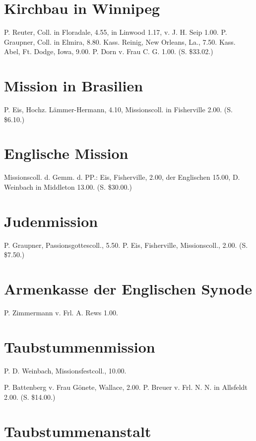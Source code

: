 \section{Kirchbau in Winnipeg}

P. Reuter, Coll. in Floradale, 4.55, in Linwood 1.17, v. J. H. Seip 1.00. P. Graupner, Coll. in Elmira, 8.80. Kass. Reinig, New Orleans, La., 7.50. Kass. Abel, Ft. Dodge, Iowa, 9.00. P. Dorn v. Frau C. G. 1.00. (S. \$33.02.)

\section{Mission in Brasilien}

P. Eis, Hochz. Lämmer-Hermann, 4.10, Missionscoll. in Fisherville 2.00. (S. \$6.10.)

\section{Englische Mission}

Missionscoll. d. Gemm. d. PP.: Eis, Fisherville, 2.00, der Englischen 15.00, D. Weinbach in Middleton 13.00. (S. \$30.00.)

\section{Judenmission}

P. Graupner, Passionsgottescoll., 5.50. P. Eis, Fisherville, Missionscoll., 2.00. (S. \$7.50.)

\section{Armenkasse der Englischen Synode}

P. Zimmermann v. Frl. A. Rews 1.00.

\section{Taubstummenmission}

P. D. Weinbach, Missionsfestcoll., 10.00.

P. Battenberg v. Frau Gönete, Wallace, 2.00. P. Breuer v. Frl. N. N. in Allsfeldt 2.00. (S. \$14.00.)

\section{Taubstummenanstalt}

